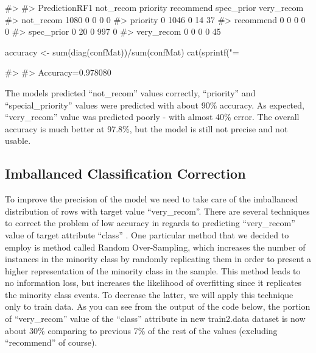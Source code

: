 \begin{Schunk}
\begin{Soutput}
#>              
#> PredictionRF1 not_recom priority recommend spec_prior very_recom
#>    not_recom       1080        0         0          0          0
#>    priority           0     1046         0         14         37
#>    recommend          0        0         0          0          0
#>    spec_prior         0       20         0        997          0
#>    very_recom         0        0         0          0         45
\end{Soutput}
\begin{Sinput}
accuracy <- sum(diag(confMat))/sum(confMat)
cat(sprintf("\nAccuracy=%f", accuracy))
\end{Sinput}
\begin{Soutput}
#> 
#> Accuracy=0.978080
\end{Soutput}
\end{Schunk}

The models predicted ``not\_recom'' values correctly, ``priority'' and
``special\_priority'' values were predicted with about 90\% accuracy. As
expected, ``very\_recom'' value was predicted poorly - with almost 40\%
error. The overall accuracy is much better at 97.8\%, but the model is
still not precise and not usable.

\newpage

\hypertarget{imballanced-classification-correction}{%
\subsection{Imballanced Classification
Correction}\label{imballanced-classification-correction}}

To improve the precision of the model we need to take care of the
imballanced distribution of rows with target value ``very\_recom''.
There are several techniques to correct the problem of low accuracy in
regards to predicting ``very\_recom'' value of target attribute
``class'' \citep{noauthor_how_2017}. One particular method that we
decided to employ is method called Random Over-Sampling, which increases
the number of instances in the minority class by randomly replicating
them in order to present a higher representation of the minority class
in the sample. This method leads to no information loss, but increases
the likelihood of overfitting since it replicates the minority class
events. To decrease the latter, we will apply this technique only to
train data. As you can see from the output of the code below, the
portion of ``very\_recom'' value of the ``class'' attribute in new
train2.data dataset is now about 30\% comparing to previous 7\% of the
rest of the values (excluding ``recommend'' of course).

